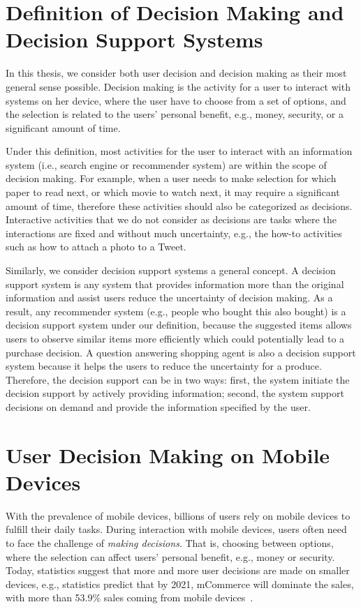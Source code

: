 
\section{Definition of Decision Making and Decision Support Systems}

In this thesis, we consider both user decision and decision making as their most general sense possible. Decision making is the activity for a user to interact with systems on her device, where the user have to choose from a set of options, and the selection is related to the users' personal benefit, e.g., money, security, or a significant amount of time. 

Under this definition, most activities for the user to interact with an information system (i.e., search engine or recommender system) are within the scope of decision making. For example, when a user needs to make selection for which paper to read next, or which movie to watch next, it may require a significant amount of time, therefore these activities should also be categorized as decisions. Interactive activities that we do not consider as decisions are tasks where the interactions are fixed and without much uncertainty, e.g., the how-to activities such as how to attach a photo to a Tweet. 

Similarly, we consider decision support systems a general concept. A decision support system is any system that provides information more than the original information and assist users reduce the uncertainty of decision making. As a result, any recommender system (e.g., people who bought this also bought) is a decision support system under our definition, because the suggested items allows users to observe similar items more efficiently which could potentially lead to a purchase decision. A question answering shopping agent is also a decision support system because it helps the users to reduce the uncertainty for a produce. Therefore, the decision support can be in two ways: first, the system initiate the decision support by actively providing information; second, the system support decisions on demand and provide the information specified by the user. 

\section{User Decision Making on Mobile Devices}
\label{ch1:sec2:motiv}

With the prevalence of mobile devices, billions of users rely on mobile devices to fulfill their daily tasks. During interaction with mobile devices, users often need to face the challenge of \emph{making decisions}. That is, choosing between options, where the selection can affect users' personal benefit, e.g., money or security. Today, statistics suggest that more and more user decisions are made on smaller devices, e.g., statistics predict that by 2021, mCommerce will dominate the sales, with more than 53.9\% sales coming from mobile devices~\cite{mcommerce53}.

